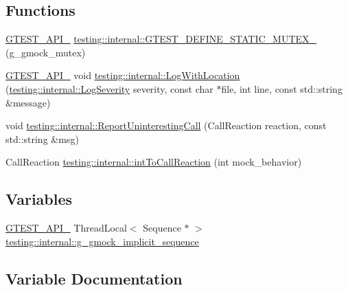 \subsection*{Functions}
\begin{DoxyCompactItemize}
\item 
\mbox{\hyperlink{gtest-port_8h_aa73be6f0ba4a7456180a94904ce17790}{G\+T\+E\+S\+T\+\_\+\+A\+P\+I\+\_\+}} \mbox{\hyperlink{namespacetesting_1_1internal_a8c4aa7be8daa7b60e293071d70a89584}{testing\+::internal\+::\+G\+T\+E\+S\+T\+\_\+\+D\+E\+F\+I\+N\+E\+\_\+\+S\+T\+A\+T\+I\+C\+\_\+\+M\+U\+T\+E\+X\+\_\+}} (g\+\_\+gmock\+\_\+mutex)
\item 
\mbox{\hyperlink{gtest-port_8h_aa73be6f0ba4a7456180a94904ce17790}{G\+T\+E\+S\+T\+\_\+\+A\+P\+I\+\_\+}} void \mbox{\hyperlink{namespacetesting_1_1internal_a07f4411f23f8b1b731858be9dda3fdcc}{testing\+::internal\+::\+Log\+With\+Location}} (\mbox{\hyperlink{namespacetesting_1_1internal_a203d1a8a2147a53d12bbdae40d443914}{testing\+::internal\+::\+Log\+Severity}} severity, const char $\ast$file, int line, const std\+::string \&message)
\item 
void \mbox{\hyperlink{namespacetesting_1_1internal_af045b703d8487374620a8106a76814ee}{testing\+::internal\+::\+Report\+Uninteresting\+Call}} (Call\+Reaction reaction, const std\+::string \&msg)
\item 
Call\+Reaction \mbox{\hyperlink{namespacetesting_1_1internal_a55ce2ee38c64db1a89feae3751439620}{testing\+::internal\+::int\+To\+Call\+Reaction}} (int mock\+\_\+behavior)
\end{DoxyCompactItemize}
\subsection*{Variables}
\begin{DoxyCompactItemize}
\item 
\mbox{\hyperlink{gtest-port_8h_aa73be6f0ba4a7456180a94904ce17790}{G\+T\+E\+S\+T\+\_\+\+A\+P\+I\+\_\+}} Thread\+Local$<$ Sequence $\ast$ $>$ \mbox{\hyperlink{namespacetesting_1_1internal_a1b1f8431e32fe7315e218986de3920b8}{testing\+::internal\+::g\+\_\+gmock\+\_\+implicit\+\_\+sequence}}
\end{DoxyCompactItemize}


\subsection{Variable Documentation}
\mbox{\label{gmock-spec-builders_8cc_a8eedfa563d9488da77e2972262a6adda}} 
